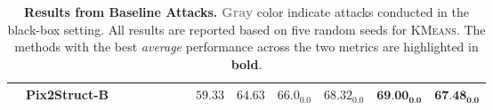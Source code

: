 \begin{table}[t]
\begin{center}
\begin{small}
\begin{adjustbox}{width=\textwidth}
\begin{tabular}{clcccccccccccc}
& {Pix2Struct-B} & \cellcolor[HTML]{C0C0C0}{$67.33$} & \cellcolor[HTML]{C0C0C0}{$67.97$} & \cellcolor[HTML]{C0C0C0}{$\textbf{68.17}_{\textbf{0.0}}$} & \cellcolor[HTML]{C0C0C0}{$\textbf{71.36}_{\textbf{0.0}}$} & \cellcolor[HTML]{C0C0C0}{$69.13_{0.07}$} & \cellcolor[HTML]{C0C0C0}{$67.67_{0.09}$} & $59.33$ & $64.63$ & $66.0_{0.0}$ & $68.32_{0.0}$ & $\textbf{69.00}_{\textbf{0.0}}$ & $\textbf{67.48}_{\textbf{0.0}}$
\\
\bottomrule
\end{tabular}
\end{adjustbox}
\end{small}
\end{center}
\caption{\textbf{Results from Baseline Attacks.} \textcolor{gray}{\textbf{Gray}} color indicate attacks conducted in the black-box setting. All results are reported based on five random seeds for \textsc{KMeans}. The methods with the best \textit{average} performance across the two metrics are highlighted in \textbf{bold}.}
\vspace{-0.2in}
\label{tab:baseline_results}
\end{table}